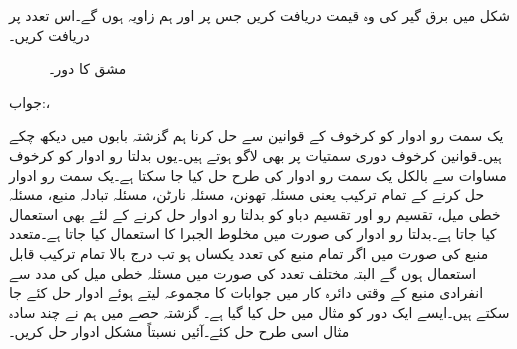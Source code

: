 شکل  میں برق گیر کی وہ قیمت دریافت کریں جس پر  اور  ہم زاویہ ہوں گے۔اس تعدد پر  دریافت کریں۔
\begin{figure}
\centering
{}
\caption{مشق  کا دور۔}
\label{شکل_بدلتا_دو_پرزے_متوازی_ب}
\end{figure}

جواب:، 

یک سمت رو ادوار کو کرخوف کے قوانین سے حل کرنا ہم گزشتہ بابوں میں دیکھ چکے ہیں۔قوانین کرخوف دوری سمتیات پر بھی لاگو ہوتے ہیں۔یوں بدلتا رو ادوار کو کرخوف مساوات سے بالکل یک سمت رو ادوار کی طرح حل کیا جا سکتا ہے۔یک سمت رو ادوار حل کرنے کے تمام ترکیب یعنی مسئلہ تھونن، مسئلہ نارٹن، مسئلہ تبادلہ منبع، مسئلہ خطی میل، تقسیم رو اور تقسیم دباو کو بدلتا رو ادوار حل کرنے کے لئے بھی استعمال کیا جاتا ہے۔بدلتا رو ادوار کی صورت میں مخلوط الجبرا کا استعمال کیا جاتا ہے۔متعدد منبع کی صورت میں اگر تمام منبع کی تعدد یکساں ہو تب درج بالا تمام ترکیب قابل استعمال ہوں گے البتہ مختلف تعدد کی صورت میں مسئلہ خطی میل کی مدد سے انفرادی منبع کے وقتی دائرہ کار میں جوابات کا مجموعہ لیتے ہوئے ادوار حل کئے جا سکتے ہیں۔ایسے ایک دور کو مثال  میں حل کیا گیا ہے۔ گزشتہ حصے میں ہم نے چند سادہ مثال اسی طرح حل کئے۔آئیں نسبتاً مشکل ادوار حل کریں۔


